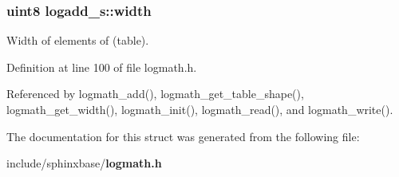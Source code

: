 \subsubsection[{width}]{\setlength{\rightskip}{0pt plus 5cm}uint8 logadd\-\_\-s\-::width}\label{structlogadd__s_a8e35a353d751d957270baf5192007c3e}


Width of elements of (table). 



Definition at line 100 of file logmath.\-h.



Referenced by logmath\-\_\-add(), logmath\-\_\-get\-\_\-table\-\_\-shape(), logmath\-\_\-get\-\_\-width(), logmath\-\_\-init(), logmath\-\_\-read(), and logmath\-\_\-write().



The documentation for this struct was generated from the following file\-:\begin{DoxyCompactItemize}
\item 
include/sphinxbase/{\bf logmath.\-h}\end{DoxyCompactItemize}
